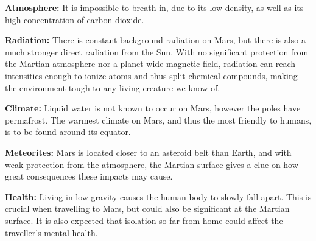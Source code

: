 
\begin{tcolorbox}[colback=red!5,colframe=DarkRed!40!black,title=5 dangers for humans to overcome at Mars \cite{dangers}]
\textbf{Atmosphere:} It is impossible to breath in, due to its low density, as well as its high concentration of carbon dioxide.

\textbf{Radiation:} There is constant background radiation on Mars, but there is also a much stronger direct radiation from the Sun.
With no significant protection from the Martian atmosphere nor a planet wide magnetic field, radiation can reach intensities enough to ionize atoms and thus split chemical compounds, making the environment tough to any living creature we know of.

\textbf{Climate:} Liquid water is not known to occur on Mars, however the poles have permafrost. The warmest climate on Mars, and thus the most friendly to humans, is to be found around its equator.

\textbf{Meteorites:} Mars is located closer to an asteroid belt than Earth, and with weak protection from the atmosphere, the Martian surface gives a clue on how great consequences these impacts may cause.

\textbf{Health:} Living in low gravity causes the human body to slowly fall apart.
This is crucial when travelling to Mars, but could also be significant at the Martian surface.
It is also expected that isolation so far from home could affect the traveller's mental health.
\end{tcolorbox}